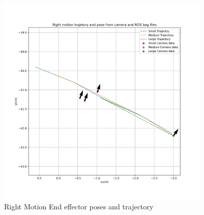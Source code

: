     
    \begin{figure}[H] 
            \centering \includegraphics[width=0.9\textwidth]{"images/experiment_5/Right_motion_trajectory_camera.png"}
            \caption{{Right Motion End effector poses and trajectory}}
            \label{fig:exp05-Right MotionEnd effector poses and trajectory}
        \end{figure}
    
    

    
    

